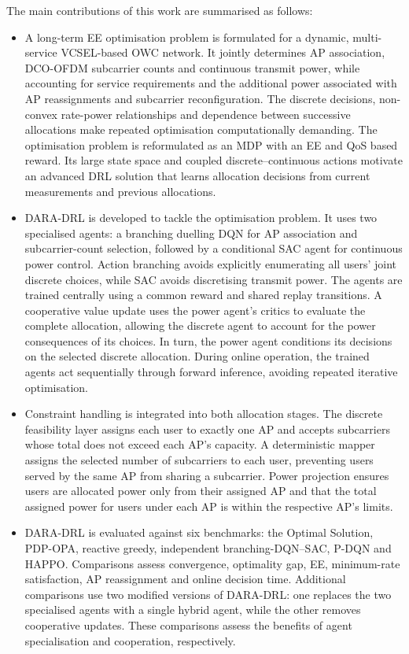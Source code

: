 \documentclass[journal]{IEEEtran}
\begin{document}
The main contributions of this work are summarised as follows:

\begin{itemize}

\item A long-term EE optimisation problem is formulated for a dynamic, multi-service VCSEL-based OWC network. It jointly determines AP association, DCO-OFDM subcarrier counts and continuous transmit power, while accounting for service requirements and the additional power associated with AP reassignments and subcarrier reconfiguration. The discrete decisions, non-convex rate-power relationships and dependence between successive allocations make repeated optimisation computationally demanding. The optimisation problem is reformulated as an MDP with an EE and QoS based reward. Its large state space and coupled discrete--continuous actions motivate an advanced DRL solution that learns allocation decisions from current measurements and previous allocations.

\item DARA-DRL is developed to tackle the optimisation problem. It uses two specialised agents: a branching duelling DQN for AP association and subcarrier-count selection, followed by a conditional SAC agent for continuous power control. Action branching avoids explicitly enumerating all users' joint discrete choices, while SAC avoids discretising transmit power. The agents are trained centrally using a common reward and shared replay transitions. A cooperative value update uses the power agent's critics to evaluate the complete allocation, allowing the discrete agent to account for the power consequences of its choices. In turn, the power agent conditions its decisions on the selected discrete allocation. During online operation, the trained agents act sequentially through forward inference, avoiding repeated iterative optimisation.

\item Constraint handling is integrated into both allocation stages. The discrete feasibility layer assigns each user to exactly one AP and accepts subcarriers whose total does not exceed each AP's capacity. A deterministic mapper assigns the selected number of subcarriers to each user, preventing users served by the same AP from sharing a subcarrier. Power projection ensures users are allocated power only from their assigned AP and that the total assigned power for users under each AP is within the respective AP's limits.

\item DARA-DRL is evaluated against six benchmarks: the Optimal Solution, PDP-OPA, reactive greedy, independent branching-DQN--SAC, P-DQN and HAPPO. Comparisons assess convergence, optimality gap, EE, minimum-rate satisfaction, AP reassignment and online decision time. Additional comparisons use two modified versions of DARA-DRL: one replaces the two specialised agents with a single hybrid agent, while the other removes cooperative updates. These comparisons assess the benefits of agent specialisation and cooperation, respectively.

\end{itemize}
\end{document}
